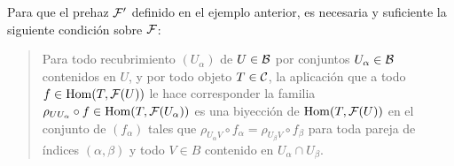 \documentclass[twoside]{article}
\begin{document}
\begin{prop}[EGA, 0-3.2.2]\label{haztop}
Para que el prehaz $\mathcal{F}'$ definido en el ejemplo anterior, es necesaria y suficiente la siguiente condición sobre $\mathcal{F}$:

\begin{verse}


Para todo recubrimiento $(U_{\alpha})$ de $U\in{\mathcal B}$ por conjuntos $U_\alpha\in{\mathcal B}$ contenidos en $U$, y por todo objeto $T\in{\mathcal C}$, la aplicación que a todo $f\in\operatorname{Hom}(T,\mathcal{F}(U))$ le hace corresponder la familia $\rho_{UU_\alpha}\circ f\in\operatorname{Hom}(T,\mathcal{F}(U_\alpha))$ es una biyección de $\operatorname{Hom}(T,\mathcal{F}(U))$ en el conjunto de $(f_\alpha)$ tales que $\rho_{U_\alpha V}\circ f_\alpha=\rho_{U_\beta V}\circ f_\beta$ para toda pareja de índices $(\alpha,\beta)$ y todo $V\in B$ contenido en $U_\alpha\cap U_\beta$. 
\end{verse}
\end{prop}
\end{document}
